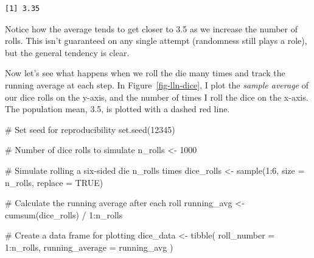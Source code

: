 \documentclass[
  letterpaper,
  DIV=11,
  numbers=noendperiod]{scrreprt}
\newenvironment{Shaded}{\begin{snugshade}}{\end{snugshade}}
\newcommand{\AttributeTok}[1]{\textcolor[rgb]{0.40,0.45,0.13}{#1}}
\newcommand{\CommentTok}[1]{\textcolor[rgb]{0.37,0.37,0.37}{#1}}
\newcommand{\ConstantTok}[1]{\textcolor[rgb]{0.56,0.35,0.01}{#1}}
\newcommand{\DecValTok}[1]{\textcolor[rgb]{0.68,0.00,0.00}{#1}}
\newcommand{\FunctionTok}[1]{\textcolor[rgb]{0.28,0.35,0.67}{#1}}
\newcommand{\NormalTok}[1]{\textcolor[rgb]{0.00,0.23,0.31}{#1}}
\newcommand{\OtherTok}[1]{\textcolor[rgb]{0.00,0.23,0.31}{#1}}
\newcommand{\SpecialCharTok}[1]{\textcolor[rgb]{0.37,0.37,0.37}{#1}}
\begin{document}
\begin{verbatim}
[1] 3.35
\end{verbatim}

Notice how the average tends to get closer to 3.5 as we increase the
number of rolls. This isn't guaranteed on any single attempt (randomness
still plays a role), but the general tendency is clear.

Now let's see what happens when we roll the die many times and track the
running average at each step. In Figure~\ref{fig-lln-dice}, I plot the
\emph{sample average} of our dice rolls on the y-axis, and the number of
times I roll the dice on the x-axis. The population mean, 3.5, is
plotted with a dashed red line.

\begin{Shaded}
\begin{Highlighting}[]
\CommentTok{\# Set seed for reproducibility}
\FunctionTok{set.seed}\NormalTok{(}\DecValTok{12345}\NormalTok{)}

\CommentTok{\# Number of dice rolls to simulate}
\NormalTok{n\_rolls }\OtherTok{\textless{}{-}} \DecValTok{1000}

\CommentTok{\# Simulate rolling a six{-}sided die n\_rolls times}
\NormalTok{dice\_rolls }\OtherTok{\textless{}{-}} \FunctionTok{sample}\NormalTok{(}\DecValTok{1}\SpecialCharTok{:}\DecValTok{6}\NormalTok{, }\AttributeTok{size =}\NormalTok{ n\_rolls, }\AttributeTok{replace =} \ConstantTok{TRUE}\NormalTok{)}

\CommentTok{\# Calculate the running average after each roll}
\NormalTok{running\_avg }\OtherTok{\textless{}{-}} \FunctionTok{cumsum}\NormalTok{(dice\_rolls) }\SpecialCharTok{/} \DecValTok{1}\SpecialCharTok{:}\NormalTok{n\_rolls}

\CommentTok{\# Create a data frame for plotting}
\NormalTok{dice\_data }\OtherTok{\textless{}{-}} \FunctionTok{tibble}\NormalTok{(}
  \AttributeTok{roll\_number =} \DecValTok{1}\SpecialCharTok{:}\NormalTok{n\_rolls,}
  \AttributeTok{running\_average =}\NormalTok{ running\_avg}
\NormalTok{)}


\end{Highlighting}
\end{Shaded}
\end{document}
